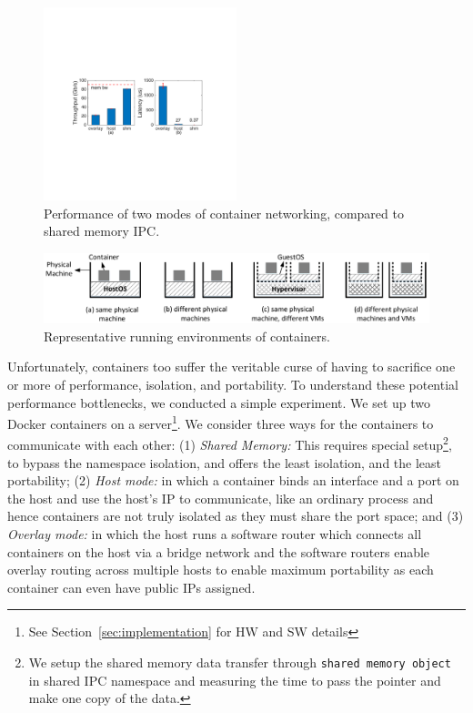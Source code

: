 \begin{figure}[th]
     \centering 
     \includegraphics[width=0.5\textwidth]{figures/intro/intro_exist2.pdf} 
     \caption{Performance of two modes of container networking, compared to
     shared memory IPC.} 
     \label{fig:three_modes} 
\end{figure} 
\begin{figure} [t]
	\centering   
	\includegraphics[width=6.7in]{figures/deployment-cases.pdf}   
	\caption{\label{fig:deploy-cases} Representative running environments of containers.}   
\end{figure}

Unfortunately, containers too suffer the veritable curse of having to sacrifice
one or more of performance, isolation, and portability. To understand these
potential performance bottlenecks, we conducted a simple experiment.  We set up
two Docker containers on a server\footnote{See Section~\ref{sec:implementation} for HW and SW details}. We consider three
ways for the containers to communicate with each other: (1) {\em Shared Memory:}
This requires special setup\footnote{We setup the shared memory data transfer
through \texttt{shared memory object} in shared IPC namespace and measuring the
time to pass the pointer and make one copy of the data.}, to bypass the
namespace isolation, and offers the least isolation, and the least portability;
(2) {\em Host mode:} in which a container binds an interface and a port on the
host and use the host's IP to communicate, like an ordinary process and hence
containers are not truly isolated as they must share the port space; and (3)
{\em Overlay mode:} in which the host runs a software router which connects all
containers on the host via a bridge network and the software routers enable
overlay routing across multiple hosts to enable maximum portability as each
container can even have public IPs assigned.

